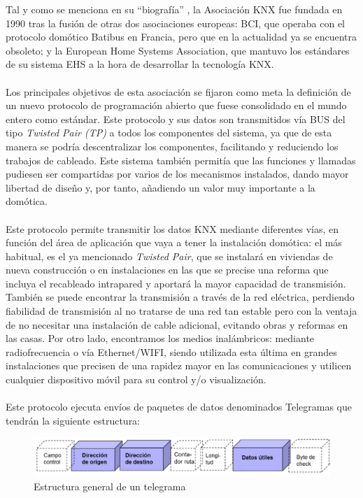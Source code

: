 Tal y como se menciona en su “biografía” \cite{KNX:2021}, la Asociación KNX fue fundada en 1990 tras la fusión de otras dos asociaciones europeas: BCI, que operaba con el protocolo domótico Batibus  en Francia, pero que en la actualidad ya se encuentra obsoleto; y la European Home Systems Association, que mantuvo los estándares de su sistema EHS a la hora de desarrollar la tecnología KNX.\\\\
Los principales objetivos de esta asociación se fijaron como meta la definición de un nuevo protocolo de programación abierto que fuese consolidado en el mundo entero como estándar. Este protocolo y sus datos son transmitidos vía BUS del tipo \textit{Twisted Pair (TP)} a todos los componentes del sistema, ya que de esta manera se podría descentralizar los componentes, facilitando y reduciendo los trabajos de cableado. Este sistema también permitía que las funciones y llamadas pudiesen ser compartidas por varios de los mecanismos instalados, dando mayor libertad de diseño y, por tanto, añadiendo un valor muy importante a la domótica.\\\\
Este protocolo permite transmitir los datos KNX mediante diferentes vías, en función del área de aplicación que vaya a tener la instalación domótica: el más habitual, es el ya mencionado \textit{Twisted Pair}, que se instalará en viviendas de nueva construcción o en instalaciones en las que se precise una reforma que incluya el recableado intrapared y aportará la mayor capacidad de transmisión. También se puede encontrar la transmisión a través de la red eléctrica, perdiendo fiabilidad de transmisión al no tratarse de una red tan estable pero con la ventaja de no necesitar una instalación de cable adicional, evitando obras y reformas en las casas. Por otro lado, encontramos los medios inalámbricos: mediante radiofrecuencia o vía Ethernet/WIFI, siendo utilizada esta última en grandes instalaciones que precisen de una rapidez mayor en las comunicaciones y utilicen cualquier dispositivo móvil para su control y/o visualización.\\\\
Este protocolo ejecuta envíos de paquetes de datos denominados Telegramas que tendrán la siguiente estructura: 
\begin{figure}[H]
\centering
\includegraphics[width=1.05\textwidth]{figures/telegrama.png} 
\caption{Estructura general de un telegrama}
\label{fig:telegrama}
\end{figure}
